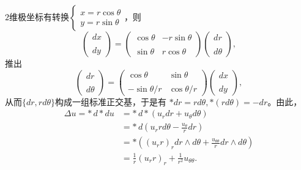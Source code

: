 \begin{itemize}
        $2$维极坐标有转换$\begin{cases} x= r \cos \theta\\
         y= r \sin \theta \end{cases}$，则
        $$\begin{pmatrix} dx\\ \\dy \end{pmatrix}= \begin{pmatrix} \cos \theta &-r \sin \theta\\ \\
        \sin \theta &r\cos \theta \end{pmatrix} \begin{pmatrix} dr\\ \\d\theta\end{pmatrix},$$
        推出
        $$\begin{pmatrix} dr\\ \\d\theta \end{pmatrix}= \begin{pmatrix}\cos \theta &\sin \theta\\ \\
        -\sin \theta /r &\cos \theta / r \end{pmatrix} \begin{pmatrix} dx\\ \\dy\end{pmatrix},$$
        从而$\{dr, rd\theta\}$构成一组标准正交基，于是有
        $*dr = rd\theta, *(rd\theta) = - dr$。由此，
        \begin{align*}
            \Delta u = *\,d*du &= *\,d*(u_r dr+ u_\theta d\theta)\\
            &= *\,d (u_r r d\theta - \frac{u_\theta}{r} dr)\\
            &= * \left((u_r r)_rdr\wedge d\theta + \frac{u_{\theta \theta}}{r}dr\wedge d\theta  \right)\\
            &=\frac{1}{r}(u_r r)_r + \frac{1}{r^2}u_{\theta \theta}.
        \end{align*}
        

\end{itemize}
